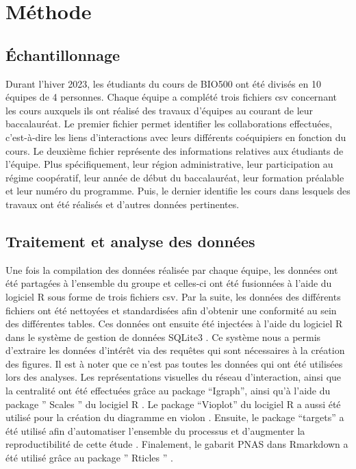 \documentclass[preprint, 3p,
authoryear]{elsarticle} %
\begin{document}
\hypertarget{muxe9thode}{%
\section{Méthode}\label{muxe9thode}}

\hypertarget{uxe9chantillonnage}{%
\subsection{Échantillonnage}\label{uxe9chantillonnage}}

Durant l'hiver 2023, les étudiants du cours de BIO500 ont été divisés en
10 équipes de 4 personnes. Chaque équipe a complété trois fichiers csv
concernant les cours auxquels ils ont réalisé des travaux d'équipes au
courant de leur baccalauréat. Le premier fichier permet identifier les
collaborations effectuées, c'est-à-dire les liens d'interactions avec
leurs différents coéquipiers en fonction du cours. Le deuxième fichier
représente des informations relatives aux étudiants de l'équipe. Plus
spécifiquement, leur région administrative, leur participation au régime
coopératif, leur année de début du baccalauréat, leur formation
préalable et leur numéro du programme. Puis, le dernier identifie les
cours dans lesquels des travaux ont été réalisés et d'autres données
pertinentes.

\hypertarget{traitement-et-analyse-des-donnuxe9es}{%
\subsection{Traitement et analyse des
données}\label{traitement-et-analyse-des-donnuxe9es}}

Une fois la compilation des données réalisée par chaque équipe, les
données ont été partagées à l'ensemble du groupe et celles-ci ont été
fusionnées à l'aide du logiciel R sous forme de trois fichiers csv. Par
la suite, les données des différents fichiers ont été nettoyées et
standardisées afin d'obtenir une conformité au sein des différentes
tables. Ces données ont ensuite été injectées à l'aide du logiciel R
dans le système de gestion de données SQLite3
\citep{muller_rsqlite_2023}. Ce système nous a permis d'extraire les
données d'intérêt via des requêtes qui sont nécessaires à la création
des figures. Il est à noter que ce n'est pas toutes les données qui ont
été utilisées lors des analyses. Les représentations visuelles du réseau
d'interaction, ainsi que la centralité ont été effectuées grâce au
package ``Igraph'', ainsi qu'à l'aide du package '' Scales '' du
locigiel R \citep{csardi_igraph_2023, wickham_scales_2022}. Le package
``Vioplot'' du locigiel R a aussi été utilisé pour la création du
diagramme en violon \citep{adler_vioplot_2022}. Ensuite, le package
``targets'' a été utilisé afin d'automatiser l'ensemble du processus et
d'augmenter la reproductibilité de cette étude
\citep{landau_tarchetypes_2023, landau_targets_2023}. Finalement, le
gabarit PNAS dans Rmarkdown a été utilisé grâce au package '' Rticles ''
\citep{allaire_rticles_2022}.
\end{document}
